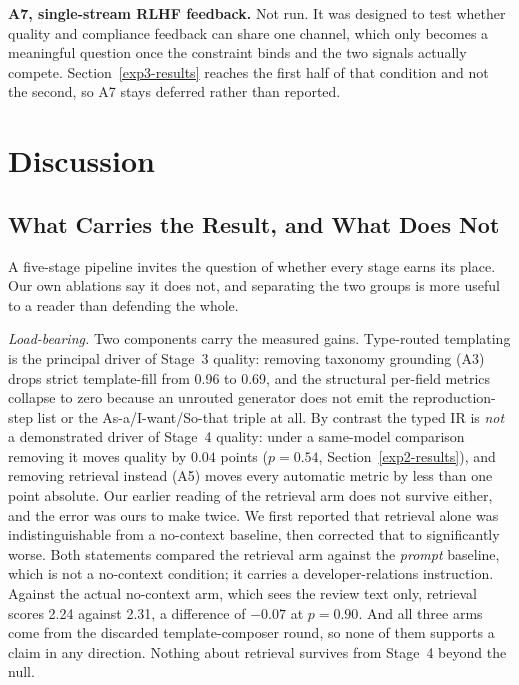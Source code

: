 \documentclass[sigconf, anonymous]{acmart}
\begin{document}
  \textbf{A7, single-stream RLHF feedback.} Not run. It was designed to test whether quality and
  compliance feedback can share one channel, which only becomes a meaningful question once the
  constraint binds and the two signals actually compete. Section~\ref{exp3-results} reaches the
  first half of that condition and not the second, so A7 stays deferred rather than reported.

\section{Discussion}\label{discussion}

\subsection{What Carries the Result, and What Does Not}\label{load-bearing}
A five-stage pipeline invites the question of whether every stage earns its place. Our own
ablations say it does not, and separating the two groups is more useful to a reader than
defending the whole.

\emph{Load-bearing.} Two components carry the measured gains. Type-routed templating is the
principal driver of Stage~3 quality: removing taxonomy grounding (A3) drops strict template-fill
from 0.96 to 0.69, and the structural per-field metrics collapse to zero because an unrouted
generator does not emit the reproduction-step list or the As-a/I-want/So-that triple at all. By
contrast the typed IR is \emph{not} a demonstrated driver of Stage~4 quality: under a same-model
comparison removing it moves quality by $0.04$ points ($p = 0.54$, Section~\ref{exp2-results}),
and removing retrieval instead (A5) moves every automatic metric by less than one point
absolute. Our earlier reading of the retrieval arm does not survive either, and the error was
ours to make twice. We first reported that retrieval alone was indistinguishable from a
no-context baseline, then corrected that to significantly worse. Both statements compared the
retrieval arm against the \emph{prompt} baseline, which is not a no-context condition; it carries
a developer-relations instruction. Against the actual no-context arm, which sees the review text
only, retrieval scores 2.24 against 2.31, a difference of $-0.07$ at $p = 0.90$. And all three
arms come from the discarded template-composer round, so none of them supports a claim in any
direction. Nothing about retrieval survives from Stage~4 beyond the null.
\end{document}
